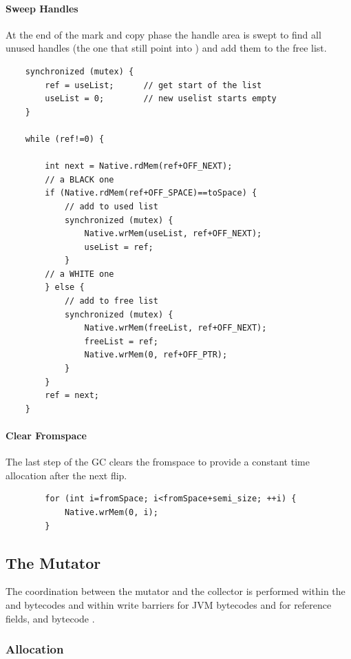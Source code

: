 \paragraph{Sweep Handles} At the end of the mark and copy phase the
handle area is swept to find all unused handles (the one that still
point into ) and add them to the free list.
%
{\small
\begin{verbatim}
    synchronized (mutex) {
        ref = useList;      // get start of the list
        useList = 0;        // new uselist starts empty
    }

    while (ref!=0) {

        int next = Native.rdMem(ref+OFF_NEXT);
        // a BLACK one
        if (Native.rdMem(ref+OFF_SPACE)==toSpace) {
            // add to used list
            synchronized (mutex) {
                Native.wrMem(useList, ref+OFF_NEXT);
                useList = ref;
            }
        // a WHITE one
        } else {
            // add to free list
            synchronized (mutex) {
                Native.wrMem(freeList, ref+OFF_NEXT);
                freeList = ref;
                Native.wrMem(0, ref+OFF_PTR);
            }
        }
        ref = next;
    }
\end{verbatim}
}

\paragraph{Clear Fromspace} The last step of the GC clears the
fromspace to provide a constant time allocation after the next flip.
%
{\small
\begin{verbatim}
        for (int i=fromSpace; i<fromSpace+semi_size; ++i) {
            Native.wrMem(0, i);
        }
\end{verbatim}
}

\subsection{The Mutator}

The coordination between the mutator and the collector is performed
within the  and  bytecodes and within write
barriers for JVM bytecodes  and  for
reference fields, and bytecode .

\subsubsection{Allocation}

